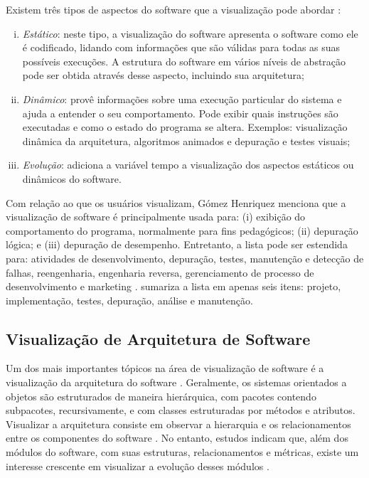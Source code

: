 Existem três tipos de aspectos do software que a visualização pode abordar \cite{Diehl2007}:
\begin{enumerate}[(i)]
	\item \textit{Estático}: neste tipo, a visualização do software apresenta o software como ele é codificado, lidando com informações que são válidas para todas as suas possíveis execuções. A estrutura do software em vários níveis de abstração pode ser obtida através desse aspecto, incluindo sua arquitetura;
	\item \textit{Dinâmico}: provê informações sobre uma execução particular do sistema e ajuda a entender o seu comportamento. Pode exibir quais instruções são executadas e como o estado do programa se altera. Exemplos: visualização dinâmica da arquitetura, algoritmos animados e depuração e testes visuais;
	\item \textit{Evolução}: adiciona a variável tempo a visualização dos aspectos estáticos ou dinâmicos do software.
\end{enumerate}

Com relação ao que os usuários visualizam, Gómez Henriquez \cite{Gomez-Henriquez2001a} menciona que a visualização de software é principalmente usada para: (i) exibição do comportamento do programa, normalmente para fins pedagógicos; (ii) depuração lógica; e (iii) depuração de desempenho. Entretanto, a lista pode ser estendida para: atividades de desenvolvimento, depuração, testes, manutenção e detecção de falhas, reengenharia, engenharia reversa, gerenciamento de processo de desenvolvimento e marketing \cite{Maletic2002}. \citeauthor{Diehl2007} sumariza a lista em apenas seis itens: projeto, implementação, testes, depuração, análise e manutenção.

\subsection{Visualização de Arquitetura de Software} \label{subsec:visualizacao-arquitetura-software}

Um dos mais importantes tópicos na área de visualização de software é a visualização da arquitetura do software \cite{Ghanam2008}\cite{Denford2002}\cite{Gallagher2005}\cite{Gallagher2008}. Geralmente, os sistemas orientados a objetos são estruturados de maneira hierárquica, com pacotes contendo subpacotes, recursivamente, e com classes estruturadas por métodos e atributos. Visualizar a arquitetura consiste em observar a hierarquia e os relacionamentos entre os componentes do software \cite{Caserta2011}. No entanto, estudos indicam que, além dos módulos do software, com suas estruturas, relacionamentos e métricas, existe um interesse crescente em visualizar a evolução desses módulos \cite{Ambros2007}.

